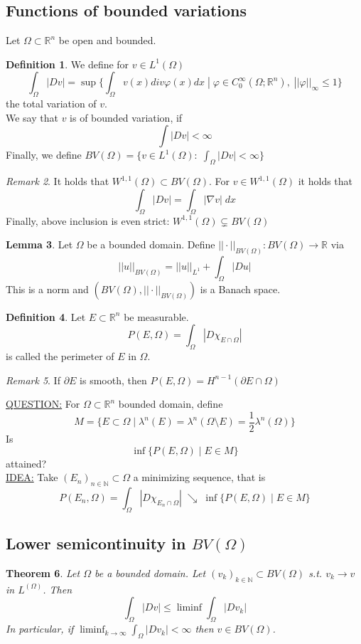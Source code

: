 \documentclass[a4paper, 12pt]{article}
\theoremstyle{plain}
\newtheorem{theorem}{Theorem}[section] %
\theoremstyle{definition}
\newtheorem{definition}[theorem]{Definition} %
\theoremstyle{lemma}
\newtheorem{lemma}[theorem]{Lemma}
\theoremstyle{remark}
\newtheorem{remark}[theorem]{Remark}
\theoremstyle{corollary}
\theoremstyle{example}
\begin{document}
	\subsection{Functions of bounded variations}
	Let $\Omega \subset \mathbb{R}^n$ be open and bounded. 
	\begin{definition}
		We define for $v \in L^1(\Omega)$
		$$\int_\Omega \left|Dv\right| = \sup\{\int_\Omega v(x) div \varphi(x) dx \; | \; \varphi \in C_0^\infty(\Omega; \mathbb{R}^n), \; ||\varphi||_\infty \leq 1\}$$ the total variation of $v$.\\
		We say that $v$ is of bounded variation, if \[\int \left|Dv\right| < \infty\]
		Finally, we define $BV(\Omega) = \{v \in L^1(\Omega): \; \int_\Omega \left|Dv\right| < \infty\}$
	\end{definition}
	\begin{remark}
		It holds that $W^{1,1}(\Omega) \subset BV(\Omega)$. For $v \in W^{1,1}(\Omega)$ it holds that \[\int_\Omega \left|Dv\right| = \int_\Omega\left|\nabla v\right| \; dx\] Finally, above inclusion is even strict: $W^{1,1}(\Omega) \subsetneq BV(\Omega)$
	\end{remark}
	\begin{lemma}
		Let $\Omega$ be a bounded domain. Define $||\cdot ||_{BV(\Omega)}: BV(\Omega) \to \mathbb{R}$ via \[||u||_{BV(\Omega)} = ||u||_{L^1} + \int_\Omega \left|Du\right|\] This is a norm and $(BV(\Omega), ||\cdot||_{BV(\Omega)})$ is a Banach space.
	\end{lemma}
	\begin{definition}
		Let $E\subset \mathbb{R}^n$ be measurable. \[P(E, \Omega) = \int_\Omega \left|D\chi_{E\cap \Omega}\right|\] is called the perimeter of $E$ in $\Omega$. 
	\end{definition}
	\begin{remark}
		If $\partial E$ is smooth, then $P(E,\Omega) = H^{n-1}(\partial E \cap \Omega)$
	\end{remark}
	\noindent\underline{QUESTION:} For $\Omega \subset \mathbb{R}^n$ bounded domain, define \[M = \{E \subset \Omega \mid \lambda^n(E) = \lambda^n(\Omega\setminus E) = \frac{1}{2} \lambda^n(\Omega)\}\] Is \[\inf \{P(E,\Omega) \mid E \in M\}\] attained?\\
	\underline{IDEA:} Take $(E_n)_{n \in \mathbb{N}} \subset \Omega$ a minimizing sequence, that is \[P(E_n, \Omega) = \int_\Omega \left|D\chi_{E_n \cap \Omega}\right| \;\searrow\; \inf\{P(E,\Omega) \mid E \in M\}\]
	\subsection{Lower semicontinuity in $BV(\Omega)$}
	\begin{theorem}
		Let $\Omega$ be a bounded domain. Let $(v_k)_{k \in \mathbb{N}} \subset BV(\Omega)$ s.t. $v_k \to v$ in $L^(\Omega)$. Then \[\int_\Omega \left|Dv\right| \leq \liminf \int_\Omega \left|Dv_k\right|\] In particular, if $\liminf_{k \to \infty} \int_\Omega \left|Dv_k\right| < \infty$ then $v \in BV(\Omega)$.
	\end{theorem}
\end{document}
